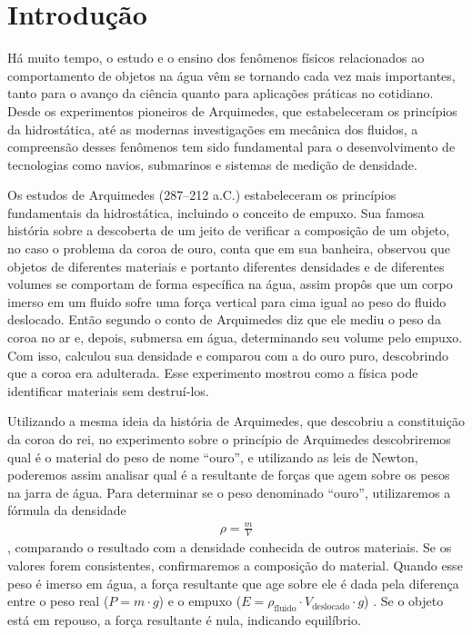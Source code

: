 \section{Introdução}

Há muito tempo, o estudo e o ensino dos fenômenos físicos relacionados ao
comportamento de objetos na água vêm se tornando cada vez mais importantes,
tanto para o avanço da ciência quanto para aplicações práticas no cotidiano.
Desde os experimentos pioneiros de Arquimedes, que estabeleceram os princípios
da hidrostática, até as modernas investigações em mecânica dos fluidos, a
compreensão desses fenômenos tem sido fundamental para o desenvolvimento de
tecnologias como navios, submarinos e sistemas de medição de densidade.

Os estudos de Arquimedes (287--212 a.C.) estabeleceram os princípios
fundamentais da hidrostática, incluindo o conceito de empuxo\cite{meneses2018}.
Sua famosa história sobre a descoberta de um jeito de verificar a composição de
um objeto, no caso o problema da coroa de ouro, conta que em sua banheira,
observou que objetos de diferentes materiais e portanto diferentes densidades e
de diferentes volumes se comportam de forma específica na água, assim propôs que
um corpo imerso em um fluido sofre uma força vertical para cima igual ao peso do
fluido deslocado\cite{nussenzveig2014}. Então segundo o conto de Arquimedes diz
que ele mediu o peso da coroa no ar e, depois, submersa em água, determinando
seu volume pelo empuxo. Com isso, calculou sua densidade e comparou com a do
ouro puro, descobrindo que a coroa era adulterada\cite{thompson2008}. Esse
experimento mostrou como a física pode identificar materiais sem destruí-los.

Utilizando a mesma ideia da história de Arquimedes, que descobriu a constituição
da coroa do rei, no experimento sobre o princípio de Arquimedes descobriremos
qual é o material do peso de nome ``ouro'', e utilizando as leis de Newton,
poderemos assim analisar qual é a resultante de forças que agem sobre os pesos
na jarra de água. Para determinar se o peso denominado ``ouro'', utilizaremos a
fórmula da densidade
\begin{align*}
	\rho = \frac{m}{V} \label{eq:densidade}
\end{align*}
\cite{nussenzveig2014}, comparando o resultado com a densidade conhecida de
outros materiais. Se os valores forem consistentes, confirmaremos a composição
do material. Quando esse peso é imerso em água, a força resultante que age sobre
ele é dada pela diferença entre o peso real ($P = m \cdot g$) e o empuxo ($E =
\rho_{\text{fluido}} \cdot V_{\text{deslocado}} \cdot g$)
\cite{nussenzveig2014}. Se o objeto está em repouso, a força resultante é nula,
indicando equilíbrio.

